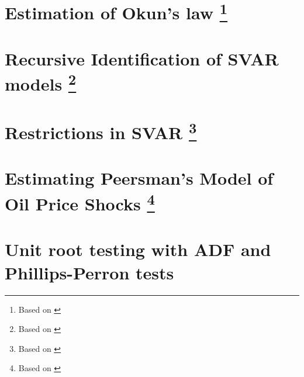 \documentclass[11pt]{article}
\begin{document}
%
%
%
%
\section{Estimation of Okun's law\texorpdfstring{%
      \protect\footnote{Based on \cite{KissNguyenOesterholm-2023}}%
  }{}}
\label{ex-Okun_law-var}


\section{Recursive Identification of SVAR models\texorpdfstring{%
      \protect\footnote{Based on \cite[][see Section 29, ``Recursively Identified Models By Short-Run Restrictions"]{Mutschler-2018-github_repo}}%
  }{}}


\section{Restrictions in SVAR\texorpdfstring{ %
      \protect\footnote{Based on \cite{MartinHurnHarris-2012,Mutschler-2018-github_repo}} %
  }{}}



\section{Estimating Peersman's Model of Oil Price Shocks\texorpdfstring{ %
      \protect\footnote{Based on \cite{MartinHurnHarris-2012,Mutschler-2018-github_repo}} %
  }{}}



\section{Unit root testing with ADF and Phillips-Perron tests}



\clearpage
\printbibliography
\end{document}
